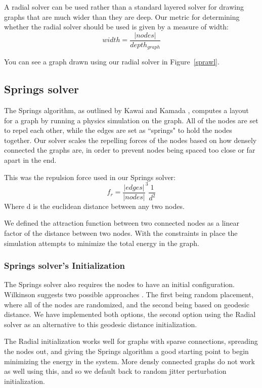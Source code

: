 \documentclass{article}
\begin{document}
A radial solver can be used rather than a standard layered solver for drawing graphs that are much wider than they are deep. Our metric 
for determining whether the radial solver should be used is given by a measure of width: 
$$width = \frac{|nodes|}{depth_{graph}}$$

You can see a graph drawn using our radial solver in Figure~\ref{sprawl}.






\subsection{Springs solver}

The Springs algorithm, as outlined by Kawai and Kamada \cite{Kamada:89}, computes a layout for a graph by running a physics simulation on the graph. All of the nodes are set to repel each other, while the edges are set as ``springs" to hold the nodes together. Our solver scales the repelling forces of the nodes based on how densely connected the graphs are, in order to prevent nodes being spaced too close or far apart in the end.

This was the repulsion force used in our Springs solver:
$$ f_r = \frac{|edges|}{|nodes|}^3 \frac{1}{d^2} $$
Where d is the euclidean distance between any two nodes. 

We defined the attraction function between two connected nodes as a linear factor of the distance between two nodes. With the constraints in place the simulation attempts to minimize the total energy in the graph.

\subsubsection{Springs solver's Initialization}
The Springs solver also requires the nodes to have an initial configuration. Wilkinson suggests two possible approaches \cite{Wilkinson:05}. The first being random placement, where all of the nodes are randomized, and the second being based on geodesic distance. We have implemented both options, the second option using the Radial solver as an alternative to this geodesic distance initialization. 

The Radial initialization works well for graphs with sparse connections, spreading the nodes out, and giving the Springs algorithm a good starting point to begin minimizing the energy in the system. More densly connected graphs do not work as well using this, and so we default back to random jitter perturbation initialization.
\end{document}

